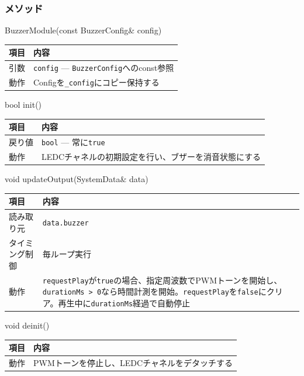 \subsubsection{メソッド}

\begin{funcblock}{BuzzerModule(const BuzzerConfig\& config)}
\begin{tabularx}{\textwidth}{l X}
\toprule
\textbf{項目} & \textbf{内容} \\
\midrule
引数   & \texttt{config} --- \texttt{BuzzerConfig}へのconst参照 \\
動作   & Configを\texttt{\_config}にコピー保持する \\
\bottomrule
\end{tabularx}
\end{funcblock}

\begin{funcblock}{bool init()}
\begin{tabularx}{\textwidth}{l X}
\toprule
\textbf{項目} & \textbf{内容} \\
\midrule
戻り値   & \texttt{bool} --- 常に\texttt{true} \\
動作     & LEDCチャネルの初期設定を行い、ブザーを消音状態にする \\
\bottomrule
\end{tabularx}
\end{funcblock}

\begin{funcblock}{void updateOutput(SystemData\& data)}
\begin{tabularx}{\textwidth}{l X}
\toprule
\textbf{項目} & \textbf{内容} \\
\midrule
読み取り元     & \texttt{data.buzzer} \\
タイミング制御 & 毎ループ実行 \\
動作           & \texttt{requestPlay}が\texttt{true}の場合、指定周波数でPWMトーンを開始し、\texttt{durationMs > 0}なら時間計測を開始。\texttt{requestPlay}を\texttt{false}にクリア。再生中に\texttt{durationMs}経過で自動停止 \\
\bottomrule
\end{tabularx}
\end{funcblock}

\begin{funcblock}{void deinit()}
\begin{tabularx}{\textwidth}{l X}
\toprule
\textbf{項目} & \textbf{内容} \\
\midrule
動作   & PWMトーンを停止し、LEDCチャネルをデタッチする \\
\bottomrule
\end{tabularx}
\end{funcblock}

